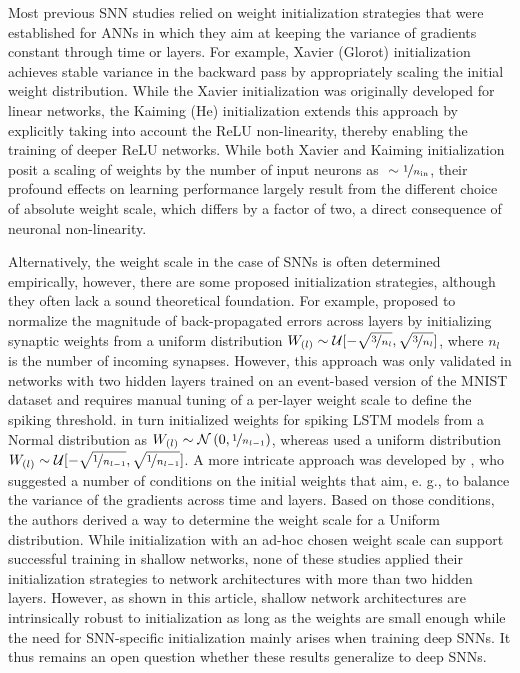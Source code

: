 \documentclass[11pt,a4paper]{article}
\begin{document}
Most previous \ac{SNN} studies relied on weight initialization strategies that were established for \acp{ANN} in which they aim at keeping the variance of gradients constant through time or layers. 
For example, Xavier (Glorot) initialization \citep{Glorot2010-dj} achieves stable variance in the backward pass by appropriately scaling the initial weight distribution. 
While the Xavier initialization was originally developed for linear networks, the Kaiming (He) initialization \citep{He2015-kv} extends this approach by explicitly taking into account the \ac{ReLU} non-linearity, thereby enabling the training of deeper \ac{ReLU} networks. 
While both Xavier and Kaiming initialization posit a scaling of weights by the number of input neurons as $~\sim \nicefrac{1}{n_\mathrm{in}}$, their profound effects on learning performance largely result from the different choice of absolute weight scale, which differs by a factor of two, a direct consequence of neuronal non-linearity.

Alternatively, the weight scale in the case of \acp{SNN} is often determined empirically, however, there are some proposed initialization strategies, although they often lack a sound theoretical foundation.
For example, \citet{Lee2016} proposed to normalize the magnitude of back-propagated errors across layers by initializing synaptic weights from a uniform distribution $W_{(l)} \sim \mathcal{U} [ -\sqrt{\nicefrac{3}{n_l}}, \sqrt{\nicefrac{3}{n_l}}]$, where $n_{l}$ is the number of incoming synapses.
However, this approach was only validated in networks with two hidden layers trained on an event-based version of the MNIST dataset \citep{Orchard2015-rl} and requires manual tuning of a per-layer weight scale to define the spiking threshold.
\citet{Bellec2018-yu} in turn initialized weights for spiking LSTM models from a Normal distribution as $W_{(l)} \sim \mathcal{N} \left( 0, \nicefrac{1}{n_{l-1}} \right)$, whereas \citet{Zenke2021-zg} used a uniform distribution $W_{(l)} \sim \mathcal{U} [ -\sqrt{\nicefrac{1}{n_{l-1}}}, \sqrt{\nicefrac{1}{n_{l-1}}}]$. 
A more intricate approach was developed by \citet{Herranz-Celotti2022}, who suggested a number of conditions on the initial weights that aim, e. g., to balance the variance of the gradients across time and layers. 
Based on those conditions, the authors derived a way to determine the weight scale for a Uniform distribution. 
While initialization with an ad-hoc chosen weight scale can support successful training in shallow networks, none of these studies applied their initialization strategies to network architectures with more than two hidden layers.
However, as shown in  this article, shallow network architectures are intrinsically robust to initialization as long as the weights are small enough while the need for \ac{SNN}-specific initialization mainly arises when training deep \acp{SNN}.
It thus remains an open question whether these results generalize to deep \acp{SNN}.
\end{document}
